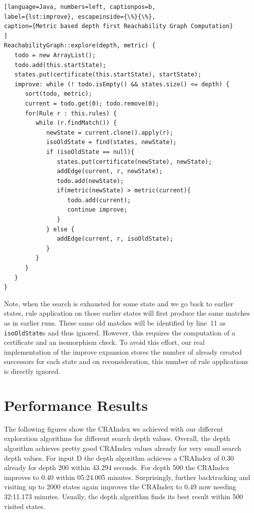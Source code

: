 \documentclass[submission,copyright,creativecommons]{eptcs}
\begin{document}
\begin{lstlisting}[language=Java, numbers=left, captionpos=b, 
label={lst:improve}, escapeinside={\%}{\%},
caption={Metric based depth first Reachability Graph Computation}
]
ReachabilityGraph::explore(depth, metric) {
   todo = new ArrayList();
   todo.add(this.startState);
   states.put(certificate(this.startState), startState);
   improve: while (! todo.isEmpty() && states.size() <= depth) {
      sort(todo, metric);
      current = todo.get(0); todo.remove(0);
      for(Rule r : this.rules) {
         while (r.findMatch()) {
            newState = current.clone().apply(r);
            isoOldState = find(states, newState);
            if (isoOldState == null){
               states.put(certificate(newState), newState);
               addEdge(current, r, newState);
               todo.add(newState);
               if(metric(newState) > metric(current){
                  todo.add(current);
                  continue improve;
               }
            } else {
               addEdge(current, r, isoOldState);
            }
         }
      }
   }
}
\end{lstlisting}

Note, when the search is exhausted for some state and we go back to earlier
states, rule application on those earlier states will first produce the same
matches as in earlier runs. These same old matches will be identified by line~11
as \texttt{isoOldState}s and thus ignored. However, this requires the computation 
of a certificate and an isomorphism check. To avoid this effort, our real 
implementation of the improve expansion stores the number of already created successors
for each state and on reconsideration, this number of rule applications is directly 
ignored.  

\section{Performance Results}
\label{sec:results}

The following figures show the CRAIndex we achieved with our different exploration algorithms
for different search depth values. Overall, the depth algorithm achieves pretty good 
CRAIndex values already for very small search depth values. For input D the depth algorithm 
achieves a CRAIndex of 0.30 already for depth 200 within 43.294 seconds. For depth 500 the 
CRAIndex improves to 0.40 within 05:24.005 minutes. Surprisingly, further backtracking and 
visiting up to 2000 states again improves the CRAIndex to 0.49 now needing 32:11.173 minutes. 
Usually, the depth algorithm finds its best result within 500 visited states. 
 
\end{document}
